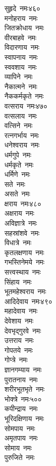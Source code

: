 \begin{multicols}{2}
\begin{flushleft}
सुहृदे~नमः\hfill ४६०\\
मनोहराय~नमः\\
जितक्रोधाय~नमः\\
वीरबाहवे~नमः\\
विदारणाय~नमः\\
स्वापनाय~नमः\\
स्ववशाय~नमः\\
व्यापिने~नमः\\
नैकात्मने~नमः\\
नैककर्मकृते~नमः\\
वत्सराय~नमः\hfill ४७०\\
वत्सलाय~नमः\\
वत्सिने~नमः\\
रत्नगर्भाय~नमः\\
धनेश्वराय~नमः\\
धर्मगुपे~नमः\\
धर्मकृते~नमः\\
धर्मिणे~नमः\\
सते~नमः\\
असते~नमः\\
क्षराय~नमः\hfill ४८०\\
अक्षराय~नमः\\
अविज्ञात्रे~नमः\\
सहस्रांशवे~नमः\\
विधात्रे~नमः\\
कृतलक्षणाय~नमः\\
गभस्तिनेमये~नमः\\
सत्त्वस्थाय~नमः\\
सिंहाय~नमः\\
भूतमहेश्वराय~नमः\\
आदिदेवाय~नमः\hfill ४९०\\
महादेवाय~नमः\\
देवेशाय~नमः\\
देवभृद्गुरवे~नमः\\
उत्तराय~नमः\\
गोपतये~नमः\\
गोप्त्रे~नमः\\
ज्ञानगम्याय~नमः\\
पुरातनाय~नमः\\
शरीरभूतभृते~नमः\\
भोक्त्रे~नमः\hfill ५००\\
कपीन्द्राय~नमः\\
भूरिदक्षिणाय~नमः\\
सोमपाय~नमः\\
अमृतपाय~नमः\\
सोमाय~नमः\\
पुरुजिते~नमः\\

\end{flushleft}
\end{multicols}
